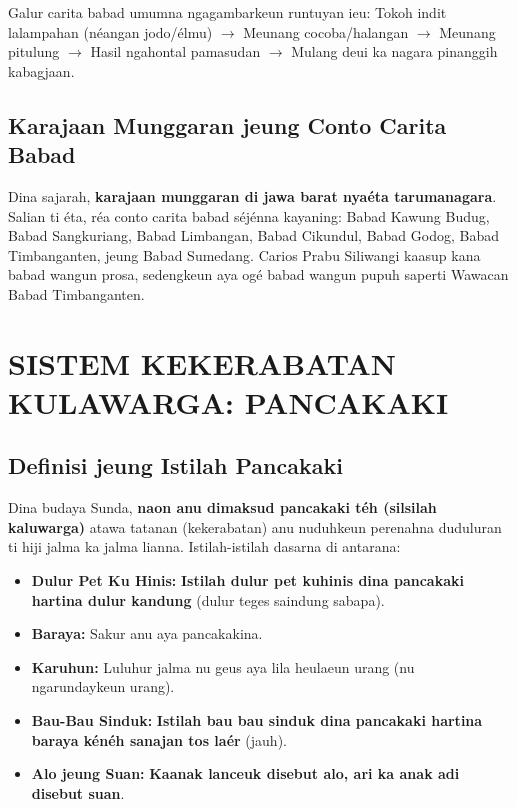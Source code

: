\documentclass[12pt, a4paper]{article}
\begin{document}
Galur carita babad umumna ngagambarkeun runtuyan ieu: 
Tokoh indit lalampahan (néangan jodo/élmu) $\rightarrow$ Meunang cocoba/halangan $\rightarrow$ Meunang pitulung $\rightarrow$ Hasil ngahontal pamasudan $\rightarrow$ Mulang deui ka nagara pinanggih kabagjaan.

\subsection{Karajaan Munggaran jeung Conto Carita Babad}
Dina sajarah, \textbf{karajaan munggaran di jawa barat nyaéta tarumanagara}. 
Salian ti éta, réa conto carita babad séjénna kayaning: Babad Kawung Budug, Babad Sangkuriang, Babad Limbangan, Babad Cikundul, Babad Godog, Babad Timbanganten, jeung Babad Sumedang. Carios Prabu Siliwangi kaasup kana babad wangun prosa, sedengkeun aya ogé babad wangun pupuh saperti Wawacan Babad Timbanganten.

\newpage

\section{SISTEM KEKERABATAN KULAWARGA: PANCAKAKI}

\subsection{Definisi jeung Istilah Pancakaki}
Dina budaya Sunda, \textbf{naon anu dimaksud pancakaki téh (silsilah kaluwarga)} atawa tatanan (kekerabatan) anu nuduhkeun perenahna duduluran ti hiji jalma ka jalma lianna. Istilah-istilah dasarna di antarana:
\begin{itemize}
    \item \textbf{Dulur Pet Ku Hinis:} \textbf{Istilah dulur pet kuhinis dina pancakaki hartina dulur kandung} (dulur teges saindung sabapa).
    \item \textbf{Baraya:} Sakur anu aya pancakakina.
    \item \textbf{Karuhun:} Luluhur jalma nu geus aya lila heulaeun urang (nu ngarundaykeun urang).
    \item \textbf{Bau-Bau Sinduk:} \textbf{Istilah bau bau sinduk dina pancakaki hartina baraya kénéh sanajan tos laér} (jauh).
    \item \textbf{Alo jeung Suan:} \textbf{Kaanak lanceuk disebut alo, ari ka anak adi disebut suan}.
\end{itemize}
\end{document}
